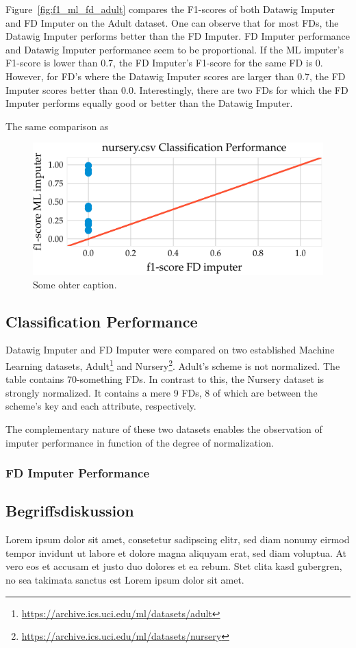 Figure~\ref{fig:f1_ml_fd_adult} compares the F1-scores of both Datawig Imputer and FD Imputer on the Adult dataset.
One can observe that for most FDs, the Datawig Imputer performs better than the FD Imputer.
FD Imputer performance and Datawig Imputer performance seem to be proportional.
If the ML imputer's F1-score is lower than 0.7, the FD Imputer's F1-score for the same FD is 0.
However, for FD's where the Datawig Imputer scores are larger than 0.7, the FD Imputer scores better than 0.0.
Interestingly, there are two FDs for which the FD Imputer performs equally good or better than the Datawig Imputer.

The same comparison as
 \begin{figure}[h]
     \centering
     \includegraphics[width=.8\textwidth]{../figures/nursery/f1_ml_fd_nursery}
     \caption{Some ohter caption.}
     \label{fig:f1_ml_fd_nursery}
\end{figure}

\subsection{Classification Performance}
Datawig Imputer and FD Imputer were compared on two established Machine Learning datasets, Adult\footnote{\url{https://archive.ics.uci.edu/ml/datasets/adult}} and Nursery\footnote{\url{https://archive.ics.uci.edu/ml/datasets/nursery}}.
Adult's scheme is not normalized.
The table contains 70-something FDs.
In contrast to this, the Nursery dataset is strongly normalized.
It contains a mere 9 FDs, 8 of which are between the scheme's key and each attribute, respectively.

The complementary nature of these two datasets enables the observation of imputer performance in function of the degree of normalization.

\subsubsection{FD Imputer Performance}
\subsection{Begriffsdiskussion}
Lorem ipsum dolor sit amet, consetetur sadipscing elitr, sed diam nonumy eirmod
tempor invidunt ut labore et dolore magna aliquyam erat, sed diam voluptua. At
vero eos et accusam et justo duo dolores et ea rebum. Stet clita kasd gubergren,
no sea takimata sanctus est Lorem ipsum dolor sit amet.
